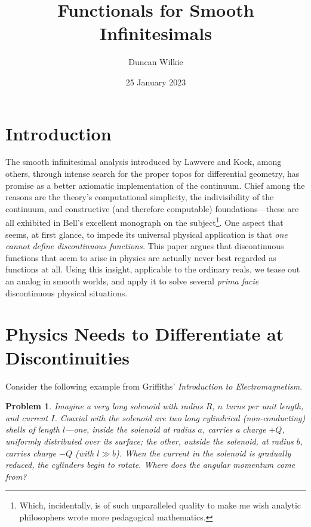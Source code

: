 \documentclass{article}
\title{Functionals for Smooth Infinitesimals}
\author{Duncan Wilkie}
\date{25 January 2023}
\newtheorem{plm}{Problem}
\begin{document}
\maketitle

\section{Introduction}

The smooth infinitesimal analysis introduced by Lawvere and Kock, among others,
through intense search for the proper topos for differential geometry, has promise as a better axiomatic implementation of the continuum.
Chief among the reasons are the theory's computational simplicity, the indivisibility of the continuum, and constructive (and therefore computable)
foundations---these are all exhibited in Bell's excellent monograph on the subject\footnote
{
  Which, incidentally, is of such unparalleled quality to make me wish analytic philosophers wrote more pedagogical mathematics.
}.
One aspect that seems, at first glance, to impede its universal physical application is that \textit{one cannot define discontinuous functions.}
This paper argues that  discontinuous functions that seem to arise in physics are actually never best regarded as functions at all.
Using this insight, applicable to the ordinary reals, we tease out an analog in smooth worlds, and apply it to solve several \textit{prima facie}
discontinuous physical situations.

\section{Physics Needs to Differentiate at Discontinuities}

Consider the following example from Griffiths' \textit{Introduction to Electromagnetism}.

\begin{plm}
  Imagine a very long solenoid with radius $R$, $n$ turns per unit length, and current $I$.
  Coaxial with the solenoid are two long cylindrical (non-conducting) shells of length $l$---one, \textit{inside} the solenoid at radius $a$,
  carries a charge $+Q$, uniformly distributed over its surface; the other, \textit{outside} the solenoid, at radius $b$,
  carries charge $-Q$ (with $l \gg b$).
  When the current in the solenoid is gradually reduced, the cylinders begin to rotate.
  Where does the angular momentum come from? %
\end{plm}
\end{document}
